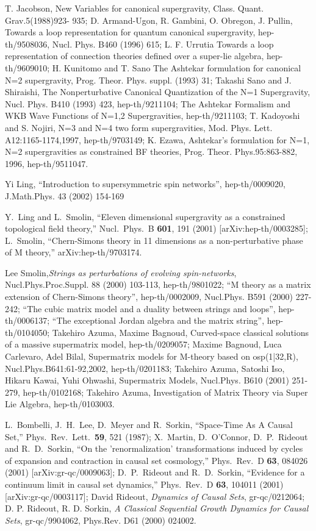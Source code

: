 \documentclass[12pt]{article}
\begin{document}
\begin{thebibliography}{0}
{T. Jacobson, New Variables for canonical supergravity, Class.
Quant. Grav.5(1988)923-
935; D. Armand-Ugon, R. Gambini, O. Obregon, J. Pullin, Towards a
loop representation
for quantum canonical supergravity, hep-th/9508036, Nucl. Phys.
B460 (1996) 615; L.
F. Urrutia Towards a loop representation of connection theories
defined over a super-lie
algebra, hep-th/9609010;  H. Kunitomo and T. Sano
The Ashtekar formulation for canonical N=2 supergravity,
Prog. Theor. Phys. suppl. (1993) 31; Takashi Sano and J. Shiraishi,
The Nonperturbative
Canonical Quantization of the N=1 Supergravity, Nucl. Phys. B410 (1993)
423, hep-th/9211104; The Ashtekar Formalism and WKB Wave Functions of N=1,2
Supergravities, hep-th/9211103; T. Kadoyoshi and S. Nojiri, N=3 and
N=4 two form
supergravities, Mod. Phys. Lett. A12:1165-1174,1997, hep-th/9703149;
K. Ezawa, Ashtekar's formulation for N=1, N=2 supergravities as
constrained BF theories,
Prog. Theor. Phys.95:863-882, 1996, hep-th/9511047.

Yi Ling, ``Introduction to supersymmetric spin networks'',
hep-th/0009020,  J.Math.Phys. 43 (2002) 154-169


Y.~Ling and L.~Smolin,
``Eleven dimensional supergravity as a constrained topological field  theory,''
Nucl.\ Phys.\ B {\bf 601}, 191 (2001)
[arXiv:hep-th/0003285]; L.~Smolin,
``Chern-Simons theory in 11 dimensions as a non-perturbative phase of M  theory,''
arXiv:hep-th/9703174.

Lee Smolin,{\it Strings as perturbations of evolving
spin-networks}, Nucl.Phys.Proc.Suppl. 88 (2000) 103-113,
hep-th/9801022;   ``M theory as a matrix extension of Chern-Simons
theory'',  hep-th/0002009, Nucl.Phys. B591 (2000) 227-242;
``The cubic matrix model and a duality between strings and loops'',
hep-th/0006137; ``The exceptional Jordan algebra and the matrix string'',
hep-th/0104050;  Takehiro Azuma, Maxime Bagnoud,
Curved-space classical solutions of a massive supermatrix model,
hep-th/0209057; Maxime Bagnoud, Luca Carlevaro, Adel Bilal,
Supermatrix models for M-theory based on osp(1|32,R),
Nucl.Phys.B641:61-92,2002,
hep-th/0201183;  Takehiro Azuma, Satoshi Iso, Hikaru Kawai, Yuhi
Ohwashi, Supermatrix Models, Nucl.Phys. B610 (2001) 251-279,
 hep-th/0102168;  Takehiro Azuma, Investigation of Matrix Theory via Super Lie Algebra,
hep-th/0103003.


L.~Bombelli, J.~H.~Lee, D.~Meyer and R.~Sorkin,
``Space-Time As A Causal Set,''
Phys.\ Rev.\ Lett.\  {\bf 59}, 521 (1987);
X.~Martin, D.~O'Connor, D.~P.~Rideout and R.~D.~Sorkin,
``On the 'renormalization' transformations induced by cycles of expansion  and contraction
in causal set cosmology,''
Phys.\ Rev.\ D {\bf 63}, 084026 (2001)
[arXiv:gr-qc/0009063];
D.~P.~Rideout and R.~D.~Sorkin,
``Evidence for a continuum limit in causal set dynamics,''
Phys.\ Rev.\ D {\bf 63}, 104011 (2001)
[arXiv:gr-qc/0003117];  David Rideout,
{\it  Dynamics of Causal Sets}, 
 gr-qc/0212064; D. P. Rideout, R. D. Sorkin,
 {\it  A Classical Sequential Growth Dynamics for Causal Sets},
 gr-qc/9904062,  Phys.Rev. D61 (2000) 024002.  

}
\end{thebibliography}
\end{document}
